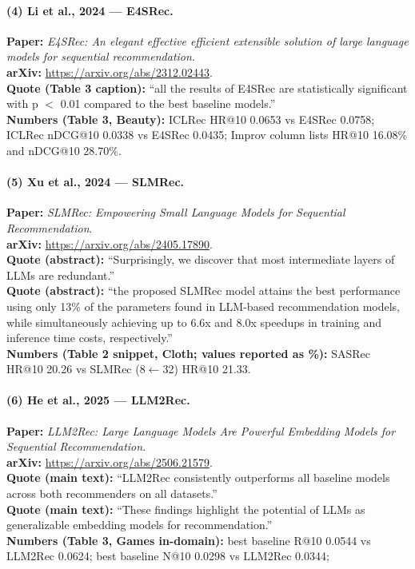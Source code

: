 \documentclass[11pt]{article}
\begin{document}
\paragraph{(4) Li et al., 2024 --- E4SRec.}
\textbf{Paper:} \emph{E4SRec: An elegant effective efficient extensible solution of large language models for sequential recommendation}.\\
\textbf{arXiv:} \url{https://arxiv.org/abs/2312.02443}.\\
\textbf{Quote (Table 3 caption):} ``all the results of E4SRec are statistically significant with p $<$ 0.01 compared to the best baseline models.''\\
\textbf{Numbers (Table 3, Beauty):} ICLRec HR@10 0.0653 vs E4SRec 0.0758; ICLRec nDCG@10 0.0338 vs E4SRec 0.0435; Improv column lists HR@10 16.08\% and nDCG@10 28.70\%.

\paragraph{(5) Xu et al., 2024 --- SLMRec.}
\textbf{Paper:} \emph{SLMRec: Empowering Small Language Models for Sequential Recommendation}.\\
\textbf{arXiv:} \url{https://arxiv.org/abs/2405.17890}.\\
\textbf{Quote (abstract):} ``Surprisingly, we discover that most intermediate layers of LLMs are redundant.''\\
\textbf{Quote (abstract):} ``the proposed SLMRec model attains the best performance using only 13\% of the parameters found in LLM-based recommendation models, while simultaneously achieving up to 6.6x and 8.0x speedups in training and inference time costs, respectively.''\\
\textbf{Numbers (Table 2 snippet, Cloth; values reported as \%):} SASRec HR@10 20.26 vs SLMRec (8$\leftarrow$32) HR@10 21.33.

\paragraph{(6) He et al., 2025 --- LLM2Rec.}
\textbf{Paper:} \emph{LLM2Rec: Large Language Models Are Powerful Embedding Models for Sequential Recommendation}.\\
\textbf{arXiv:} \url{https://arxiv.org/abs/2506.21579}.\\
\textbf{Quote (main text):} ``LLM2Rec consistently outperforms all baseline models across both recommenders on all datasets.''\\
\textbf{Quote (main text):} ``These findings highlight the potential of LLMs as generalizable embedding models for recommendation.''\\
\textbf{Numbers (Table 3, Games in-domain):} best baseline R@10 0.0544 vs LLM2Rec 0.0624; best baseline N@10 0.0298 vs LLM2Rec 0.0344; %
\end{document}
